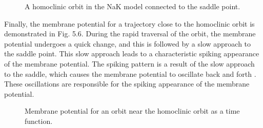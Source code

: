 \documentclass[12pt,a4paper]{report}
\begin{document}
\begin{figure}[H]
    \centering %
    \caption{A homoclinic orbit in the NaK model connected to the saddle point.\cite{ref9}} 
\end{figure}
    
Finally, the membrane potential for a trajectory close to the homoclinic orbit is demonstrated in Fig. 5.6. During the rapid traversal of the orbit, the membrane potential undergoes a quick change, and this is followed by a slow approach to the saddle point. This slow approach leads to a characteristic spiking appearance of the membrane potential. The spiking pattern is a result of the slow approach to the saddle, which causes the membrane potential to oscillate back and forth \cite{ref10}. These oscillations are responsible for the spiking appearance of the membrane potential.

\begin{figure}[H]
    \centering %
    \caption{Membrane potential for an orbit near the homoclinic orbit as a time function.\cite{ref10}} 
\end{figure}
\end{document}

